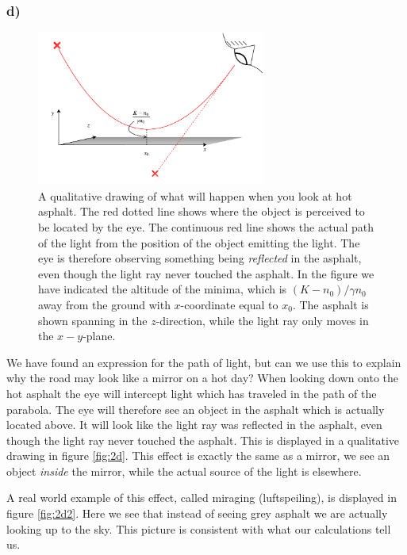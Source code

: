 \documentclass[12pt,twoside]{article}
\begin{document}
\subsubsection*{d)}
\begin{figure}
  \centering
  \includegraphics[width=0.67\textwidth]{../figures/drawing.pdf}
  \caption{A qualitative drawing of what will happen when you look at hot asphalt. The red dotted line shows where the object is perceived to be located by the eye. The continuous red line shows the actual path of the light from the position of the object emitting the light. The eye is therefore observing something being \textit{reflected} in the asphalt, even though the light ray never touched the asphalt. In the figure we have indicated the altitude of the minima, which is $(K-n_0)/\gamma n_0$ away from the ground with $x$-coordinate equal to $x_0$. The asphalt is shown spanning in the $z$-direction, while the light ray only moves in the $x-y$-plane.}
  \label{fig:2d}
\end{figure}
We have found an expression for the path of light, but can we use this to explain why the road may look like a mirror on a hot day? When looking down onto the hot asphalt the eye will intercept light which has traveled in the path of the parabola. The eye will therefore see an object in the asphalt which is actually located above. It will look like the light ray was reflected in the asphalt, even though the light ray never touched the asphalt. This is displayed in a qualitative drawing in figure \vref{fig:2d}. This effect is exactly the same as a mirror, we see an object \textit{inside} the mirror, while the actual source of the light is elsewhere.\par
A real world example of this effect, called miraging (luftspeiling), is displayed in figure \vref{fig:2d2}. Here we see that instead of seeing grey asphalt we are actually looking up to the sky. This picture is consistent with what our calculations tell us.
\end{document}
